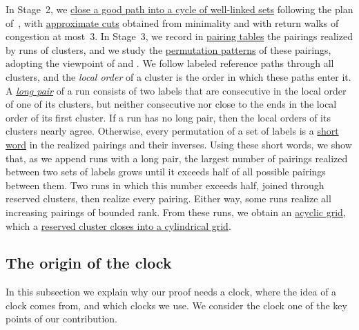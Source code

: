 \documentclass[fontsize=12pt,leading=14pt]{fullpaper}
\begin{document}
In Stage~2, we \hyperref[thm:closing]{close a good path into a cycle of well-linked sets} following the plan of~\cite{HKMM26b}, with \hyperref[def:slice]{approximate cuts} obtained from minimality and with return walks of congestion at most~$3$.
In Stage~3, we record in \hyperref[def:s3-pairing-table]{pairing tables} the pairings realized by runs of clusters, and we study the \hyperref[def:s3-patterns]{permutation patterns} of these pairings, adopting the viewpoint of \textcite{AtkinsonBeals01} and \textcite{Lehtonen20}.
We follow labeled reference paths through all clusters, and the \emph{local order} of a cluster is the order in which these paths enter it.
A \hyperref[def:s3-long-pair]{\emph{long pair}} of a run consists of two labels that are consecutive in the local order of one of its clusters, but neither consecutive nor close to the ends in the local order of its first cluster.
If a run has no long pair, then the local orders of its clusters nearly agree.
Otherwise, every permutation of a set of labels is a \hyperref[lem:s3-short-words]{short word} in the realized pairings and their inverses.
Using these short words, we show that, as we append runs with a long pair, the largest number of pairings realized between two sets of labels grows until it exceeds half of all possible pairings between them.
Two runs in which this number exceeds half, joined through reserved clusters, then realize every pairing.
Either way, some runs realize all increasing pairings of bounded rank.
From these runs, we obtain an \hyperref[lem:anchored-grid]{acyclic grid}, which a \hyperref[lem:close-grid]{reserved cluster closes into a cylindrical grid}.

\subsection{The origin of the clock}\label{sec:ov-clock}

In this subsection we explain why our proof needs a clock, where the idea of a clock comes from, and which clocks we use.
We consider the clock one of the key points of our contribution.
\end{document}
